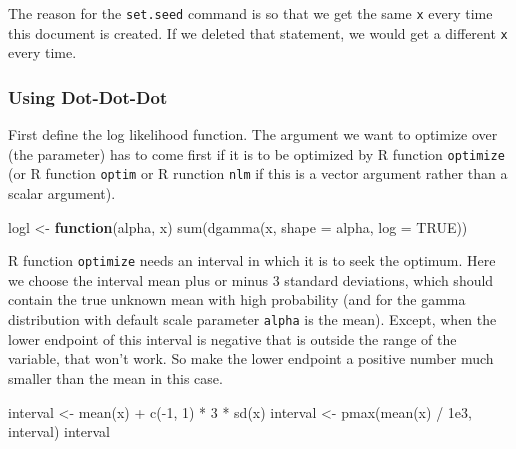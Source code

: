 \documentclass[
]{article}
\newenvironment{Shaded}{\begin{snugshade}}{\end{snugshade}}
\newcommand{\AttributeTok}[1]{\textcolor[rgb]{0.77,0.63,0.00}{#1}}
\newcommand{\ConstantTok}[1]{\textcolor[rgb]{0.00,0.00,0.00}{#1}}
\newcommand{\ControlFlowTok}[1]{\textcolor[rgb]{0.13,0.29,0.53}{\textbf{#1}}}
\newcommand{\DecValTok}[1]{\textcolor[rgb]{0.00,0.00,0.81}{#1}}
\newcommand{\FloatTok}[1]{\textcolor[rgb]{0.00,0.00,0.81}{#1}}
\newcommand{\FunctionTok}[1]{\textcolor[rgb]{0.00,0.00,0.00}{#1}}
\newcommand{\NormalTok}[1]{#1}
\newcommand{\OtherTok}[1]{\textcolor[rgb]{0.56,0.35,0.01}{#1}}
\newcommand{\SpecialCharTok}[1]{\textcolor[rgb]{0.00,0.00,0.00}{#1}}
\begin{document}
The reason for the \texttt{set.seed} command is so that we get the same
\texttt{x} every time this document is created. If we deleted that
statement, we would get a different \texttt{x} every time.

\hypertarget{using-dot-dot-dot}{%
\subsubsection{Using Dot-Dot-Dot}\label{using-dot-dot-dot}}

First define the log likelihood function. The argument we want to
optimize over (the parameter) has to come first if it is to be optimized
by R function \texttt{optimize} (or R function \texttt{optim} or R
runction \texttt{nlm} if this is a vector argument rather than a scalar
argument).

\begin{Shaded}
\begin{Highlighting}[]
\NormalTok{logl }\OtherTok{\textless{}{-}} \ControlFlowTok{function}\NormalTok{(alpha, x)}
    \FunctionTok{sum}\NormalTok{(}\FunctionTok{dgamma}\NormalTok{(x, }\AttributeTok{shape =}\NormalTok{ alpha, }\AttributeTok{log =} \ConstantTok{TRUE}\NormalTok{))}
\end{Highlighting}
\end{Shaded}

R function \texttt{optimize} needs an interval in which it is to seek
the optimum. Here we choose the interval mean plus or minus 3 standard
deviations, which should contain the true unknown mean with high
probability (and for the gamma distribution with default scale parameter
\texttt{alpha} is the mean). Except, when the lower endpoint of this
interval is negative that is outside the range of the variable, that
won't work. So make the lower endpoint a positive number much smaller
than the mean in this case.

\begin{Shaded}
\begin{Highlighting}[]
\NormalTok{interval }\OtherTok{\textless{}{-}} \FunctionTok{mean}\NormalTok{(x) }\SpecialCharTok{+} \FunctionTok{c}\NormalTok{(}\SpecialCharTok{{-}}\DecValTok{1}\NormalTok{, }\DecValTok{1}\NormalTok{) }\SpecialCharTok{*} \DecValTok{3} \SpecialCharTok{*} \FunctionTok{sd}\NormalTok{(x)}
\NormalTok{interval }\OtherTok{\textless{}{-}} \FunctionTok{pmax}\NormalTok{(}\FunctionTok{mean}\NormalTok{(x) }\SpecialCharTok{/} \FloatTok{1e3}\NormalTok{, interval)}
\NormalTok{interval}
\end{Highlighting}
\end{Shaded}
\end{document}
